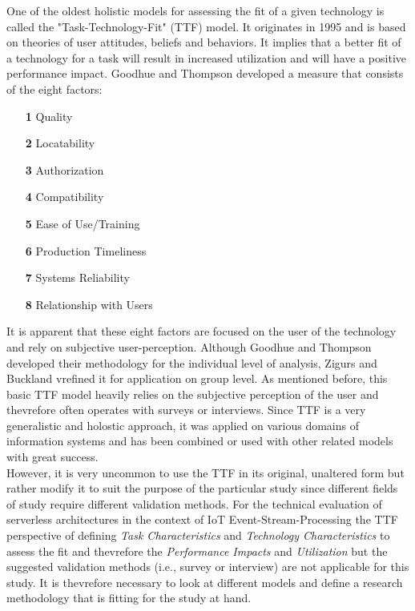     One of the oldest holistic models for assessing the fit of a given technology is called the "Task-Technology-Fit" (TTF) model. It originates in 1995 and is based on theories of user attitudes, beliefs and behaviors. It implies that a better fit of a technology for a task will result in increased utilization and will have a positive performance impact. Goodhue and Thompson developed a measure that consists of the eight factors:
    \begin{enumerate}[nolistsep]
        \item[\textbf{1}] Quality
        \item[\textbf{2}] Locatability
        \item[\textbf{3}] Authorization
        \item[\textbf{4}] Compatibility
        \item[\textbf{5}] Ease of Use/Training
        \item[\textbf{6}] Production Timeliness
        \item[\textbf{7}] Systems Reliability
        \item[\textbf{8}] Relationship with Users
    \end{enumerate}
    It is apparent that these eight factors are focused on the user of the technology and rely on subjective user-perception. Although Goodhue and Thompson developed their methodology for the individual level of analysis, Zigurs and Buckland vrefined it for application on group level.\autocite{Zigurs1998AEffectiveness} As mentioned before, this basic TTF model heavily relies on the subjective perception of the user and thevrefore often operates with surveys or interviews. Since TTF is a very generalistic and holostic approach, it was applied on various domains of information systems and has been combined or used with other related models with great success.\\ 
    However, it is very uncommon to use the TTF in its original, unaltered form but rather modify it to suit the purpose of the particular study since different fields of study require different validation methods. For the technical evaluation of serverless architectures in the context of IoT Event-Stream-Processing the TTF perspective of defining \textit{Task Characteristics} and \textit{Technology Characteristics} to assess the fit and thevrefore the \textit{Performance Impacts} and \textit{Utilization} but the suggested validation methods (i.e., survey or interview) are not applicable for this study. It is thevrefore necessary to look at different models and define a research methodology that is fitting for the study at hand. 
    
